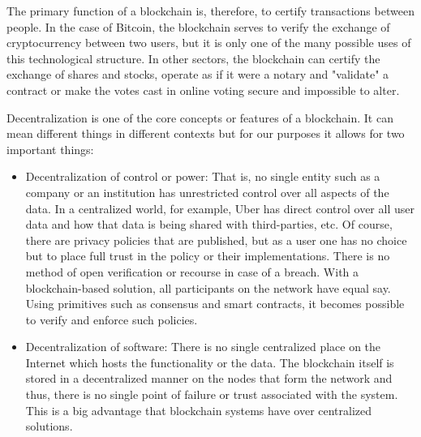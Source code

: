  The primary function of a blockchain is, therefore, to certify transactions between people. In the case of Bitcoin, the
 blockchain serves to verify the exchange of cryptocurrency between two users, but it is only one of the many possible
 uses of this technological structure. In other sectors, the blockchain can certify the exchange of shares and stocks,
 operate as if it were a notary and "validate" a contract or make the votes cast in online voting secure and impossible
 to alter.

Decentralization is one of the core concepts or features of a blockchain. It can mean different things in different
contexts but for our purposes it allows for two important things:
\begin{itemize}
    \item Decentralization of control or power: That is, no single entity such as a company or an institution has
        unrestricted control over all aspects of the data. In a centralized world, for example, Uber has direct control
        over all user data and how that data is being shared with third-parties, etc. Of course, there are privacy
        policies that are published, but as a user one has no choice but to place full trust in the policy or their
        implementations. There is no method of open verification or recourse in case of a breach. With a
        blockchain-based solution, all participants on the network have equal say. Using primitives such as consensus
        and smart contracts, it becomes possible to verify and enforce such policies.
    \item Decentralization of software: There is no single centralized place on the Internet which hosts the
        functionality or the data. The blockchain itself is stored in a decentralized manner on the nodes that form the
        network and thus, there is no single point of failure or trust associated with the system. This is a big
        advantage that blockchain systems have over centralized solutions.
\end{itemize}

